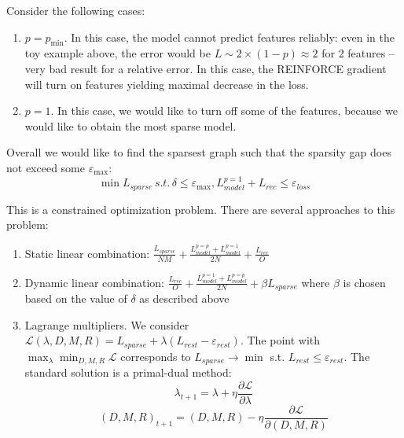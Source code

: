 \documentclass[a4paper,11pt,oneside]{report}
\begin{document}
Consider the following cases:
\begin{enumerate}
    \item $p=p_{\min}$. In this case, the model cannot predict features reliably: even in the toy example above, the error would be $L\sim 2\times (1-p)\approx 2$ for 2 features -- very bad result for a relative error. In this case, the REINFORCE gradient will turn on features yielding maximal decrease in the loss.
    \item $p=1$. In this case, we would like to turn off some of the features, because we would like to obtain the most sparse model.
\end{enumerate}

Overall we would like to find the sparsest graph such that the sparsity gap does not exceed some $\varepsilon_{\max}$:
$$
\min L_{sparse}\,s.t.\,\delta\leq \varepsilon_{\max},L_{model}^{p=1}+L_{rec}\leq \varepsilon_{loss}
$$

This is a constrained optimization problem. There are several approaches to this problem:
\begin{enumerate}
    \item Static linear combination: $\frac{L_{sparse}}{NM}+\frac{L_{model}^{p=p}+L_{model}^{p=1}}{2N}+\frac{L_{rec}}{O}$
    \item Dynamic linear combination: $\frac{L_{rec}}{O}+\frac{L_{model}^{p=1}+L_{model}^{p=p}}{2N}+\beta L_{sparse}$ where $\beta$ is chosen based on the value of $\delta$ as described above
    \item Lagrange multipliers. We consider $\mathcal L(\lambda, D, M, R)=L_{sparse}+\lambda (L_{rest}-\varepsilon_{rest})$. The point with $\max_{\lambda}\min_{D, M, R}\mathcal L$ corresponds to $L_{sparse}\to\min$ s.t. $L_{rest}\leq\varepsilon_{rest}$. The standard solution is a primal-dual method:
    $$\lambda_{t+1}=\lambda+\eta\frac{\partial \mathcal L}{\partial \lambda}$$
    $$(D, M,R)_{t+1}=(D,M,R)-\eta\frac{\partial\mathcal L}{\partial (D, M, R)}$$
\end{enumerate}
\end{document}
